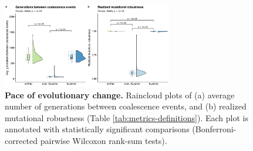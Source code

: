 
\begin{figure}[h!]
    \centering
    \includegraphics[width=0.66\textwidth]{media/evolutionary-change-pace-panel.pdf}
    \caption{\small
    \textbf{Pace of evolutionary change.}
    Raincloud plots of 
    (a) average number of generations between coalescence events,
    and (b) realized mutational robustness (Table \ref{tab:metrics-definitions}).
    Each plot is annotated with statistically significant comparisons (Bonferroni-corrected pairwise Wilcoxon rank-sum tests).
    }
    \label{fig:evolutionary-dynamics-rate}
\end{figure}
